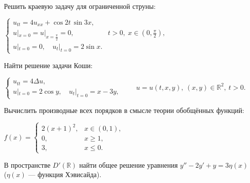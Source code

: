 
\begin{cond}
\end{cond}

\begin{cond}
\end{cond}

\begin{cond}
	Решить краевую задачу для ограниченной струны:

	\(
	\begin{cases}
		u_{tt} = 4u_{xx} + \cos 2t \,\sin 3x,                                               \\
		u|_{x=0} = u|_{x=\frac{\pi}{2}} = 0, & t > 0,\; x \in \left(0,\frac{\pi}{2}\right), \\
		u|_{t=0} = 0,\quad u_t|_{t=0} = 2\sin x.
	\end{cases}
	\)
\end{cond}

\begin{cond}
	Найти решение задачи Коши:

	\(
	\begin{cases}
		u_{tt} = 4\Delta u, \\
		u|_{t=0} = 2\cos y,\quad u_t|_{t=0} = x - 3y,
	\end{cases}
	\qquad
	u = u(t,x,y),\ (x,y)\in\mathbb{R}^2,\ t>0.
	\)
\end{cond}

\begin{cond}
	Вычислить производные всех порядков в смысле теории обобщённых функций:

	\(
	f(x) =
	\begin{cases}
		2(x+1)^2, & x \in (0,1), \\
		0,        & x \ge 1,     \\
		3,        & x \le 0.
	\end{cases}
	\)
\end{cond}

\begin{cond}
	В пространстве \(D'(\mathbb{R})\) найти общее решение уравнения
	$y'' - 2y' + y = 3\eta(x)$ \;(\(\eta(x)\) — функция Хэвисайда).
\end{cond}
